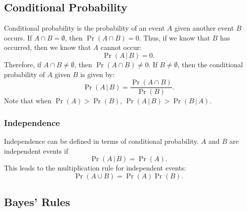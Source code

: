 \documentclass{article}
\begin{document}
\subsection{Conditional Probability}
Conditional probability is the probability of an event \(A\) given
another event \(B\) occurs. If \(A \cap B = \emptyset\), then
\(\Pr{\left( A \cap B \right)} = 0\). Thus, if we know that \(B\) has
occurred, then we know that \(A\) cannot occur:
\begin{equation*}
    \Pr{\left( A \,\vert\, B \right)} = 0.
\end{equation*}
Therefore, if \(A \cap B \neq \emptyset\), then
\(\Pr{\left( A \cap B \right)} \neq 0\). If \(B \neq \emptyset\), then
the conditional probability of \(A\) given \(B\) is given by:
\begin{equation*}
    \Pr{\left( A \,\vert\, B \right)} = \frac{\Pr{\left( A \cap B \right)}}{\Pr{\left( B \right)}}.
\end{equation*}
Note that when \(\Pr{\left( A \right)} > \Pr{\left( B \right)}\), \(\Pr{\left( A \,\vert\, B \right)} > \Pr{\left( B \,\vert\, A \right)}\).
\subsubsection{Independence}
Independence can be defined in terms of conditional probability. \(A\)
and \(B\) are independent events if
\begin{equation*}
    \Pr{\left( A \,\vert\, B \right)} = \Pr{\left( A \right)}.
\end{equation*}
This leads to the multiplication rule for independent events:
\begin{equation*}
    \Pr{\left( A \cup B \right)} = \Pr{\left( A \right)} \Pr{\left( B \right)}.
\end{equation*}
\subsection{Bayes' Rules}
\end{document}
